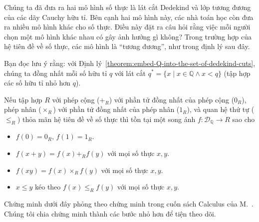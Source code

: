 Chúng ta đã đưa ra hai mô hình số thực là lát cắt Dedekind và lớp tương đương của các dãy Cauchy hữu tỉ. Bên cạnh hai mô hình này, các nhà toán học còn đưa ra nhiều mô hình khác cho số thực. Điều này đặt ra câu hỏi rằng việc mỗi người chọn một mô hình khác nhau có gây ảnh hưởng gì không? Trong trường hợp của hệ tiên đề về số thực, các mô hình là ``tương đương'', như trong định lý sau đây.

Bạn đọc lưu ý rằng: với Định lý~\ref{theorem:embed-Q-into-the-set-of-dedekind-cuts}, chúng ta đồng nhất mỗi số hữu tỉ $q$ với lát cắt $q^{*} = \{ x \mid x\in\mathbb{Q} \wedge x < q \}$ (tập hợp các số hữu tỉ nhỏ hơn $q$).

\begin{theorem}\label{theorem:uniqueness-of-complete-ordered-field}
    Nếu tập hợp $R$ với phép cộng (${+}_{R}$) với phần tử đồng nhất của phép cộng ($0_{R}$), phép nhân (${\times}_{R}$) với phần tử đồng nhất của phép nhân ($1_{R}$), và quan hệ thứ tự ($\leq_{R}$) thỏa mãn hệ tiên đề về số thực thì tồn tại một song ánh $f: \mathscr{D}_{\mathbb{Q}}\to R$ sao cho
    \begin{itemize}[topsep=0pt,itemsep=0pt]
        \item $f(0) = 0_{R}$, $f(1) = 1_{R}$.
        \item $f(x + y) = f(x) +_{R} f(y)$ với mọi số thực $x, y$.
        \item $f(xy) = f(x) \times_{R} f(y)$ với mọi số thực $x, y$.
        \item $x\leq y$ kéo theo $f(x)\leq_{R} f(y)$ với mọi số thực $x, y$.
    \end{itemize}
\end{theorem}

Chứng minh dưới đây phỏng theo chứng minh trong cuốn sách Calculus của M.\@Spivak~\cite{spivak}. Chúng tôi chia chứng minh thành các bước nhỏ hơn để tiện theo dõi.

